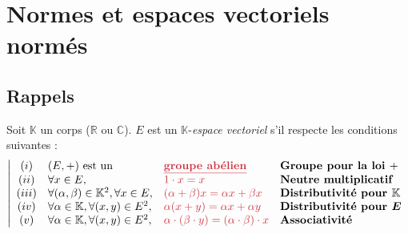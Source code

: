 \documentclass[11pt,a4paper,fleqn,pdftex]{report}
\begin{document}
\section{Normes et espaces vectoriels normés}
\subsection{Rappels} %
\label{sub:rappels}
\begin{dfn}
     Soit $\mathbb{K}$ un corps ($\mathbb{R}$ ou $\mathbb{C}$).\newline
     $E$ est un $\mathbb{K}$-\emph{espace vectoriel} s'il respecte les conditions suivantes : 
     \begin{equation}
        \left| 
      \begin{array}{c l l l}
       (i)  &(E,+) \text{ est un }&\text{\textcolor{couleur4}{\bf\underline{groupe abélien}}}&\textbf{Groupe pour la loi }+\\
       (ii) &\forall x\in E,& \textcolor{couleur4}{{1\cdot x = x}}&\textbf{Neutre multiplicatif}\\
       (iii) &\forall (\alpha, \beta) \in \mathbb{K}^2, \forall x\in E,& \textcolor{couleur4}{{(\alpha + \beta) x = \alpha x + \beta x}} &\textbf{Distributivité pour }\boldsymbol{\mathbb{K}} \\
       (iv) &\forall \alpha \in \mathbb{K}, \forall (x,y) \in E^2,& \textcolor{couleur4}{{\alpha (x+y) = \alpha x + \alpha y}} &\textbf{Distributivité pour }\boldsymbol{E}\\
       (v) &\forall \alpha \in \mathbb{K}, \forall (x,y) \in E^2,& \textcolor{couleur4}{{\alpha \cdot (\beta \cdot y) = (\alpha \cdot \beta ) \cdot x}} &\textbf{Associativité}
      \end{array}
        \right.
     \end{equation}
     
\end{dfn}
\end{document}

